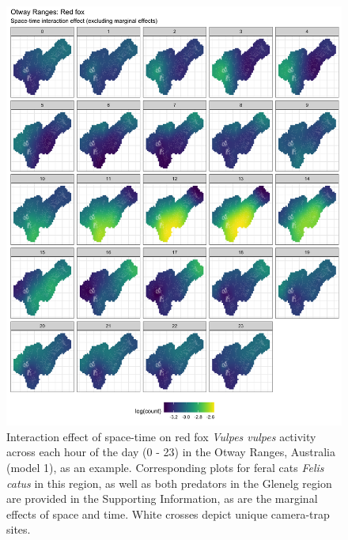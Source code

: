 \documentclass[11pt,a4paper,titlepage,twoside,openright]{style/unimelbthesis}
\begin{document}
\begin{mainmatter}
\begin{figure}
{\centering \includegraphics[width=1\linewidth]{figure/spte_diff_avg_o_fox} 

}

\caption{Interaction effect of space-time on red fox \textit{Vulpes vulpes} activity across each hour of the day (0 - 23) in the Otway Ranges, Australia (model 1), as an example. Corresponding plots for feral cats \textit{Felis catus} in this region, as well as both predators in the Glenelg region are provided in the Supporting Information, as are the marginal effects of space and time. White crosses depict unique camera-trap sites.}\label{fig:diel-st-int-o-fox}
\end{figure}
\begin{figure}


\end{figure}
\end{mainmatter}
\end{document}
